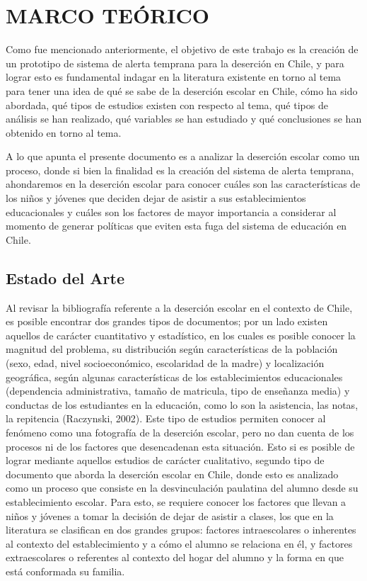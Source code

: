 \chapter{MARCO TEÓRICO}
\label{ch:marcoteorico}
Como fue mencionado anteriormente, el objetivo de este trabajo es la creación de un prototipo de sistema de alerta temprana para la deserción en Chile, y para lograr esto es fundamental indagar en la literatura existente en torno al tema para tener una idea de qué se sabe de la deserción escolar en Chile, cómo ha sido abordada, qué tipos de estudios existen con respecto al tema, qué tipos de análisis se han realizado, qué variables se han estudiado y qué conclusiones se han obtenido en torno al tema. 

A lo que apunta el presente documento es a analizar la deserción escolar como un proceso, donde si bien la finalidad es la creación del sistema de alerta temprana, ahondaremos en la deserción escolar para conocer cuáles son las características de los niños y jóvenes que deciden dejar de asistir a sus establecimientos educacionales y cuáles son los factores de mayor importancia a considerar al momento de generar políticas que eviten esta fuga del sistema de educación en Chile. 

\section{Estado del Arte}

Al revisar la bibliografía  referente a la deserción escolar en el contexto de Chile, es posible encontrar dos grandes tipos de documentos; por un lado existen aquellos de carácter cuantitativo y estadístico, en los cuales es posible conocer la magnitud del problema, su distribución según características de la población (sexo, edad, nivel socioeconómico, escolaridad de la madre) y localización geográfica, según algunas características de los establecimientos educacionales (dependencia administrativa, tamaño de matricula, tipo de enseñanza media) y conductas de los estudiantes en la educación, como lo son la asistencia, las notas, la repitencia (Raczynski, 2002). Este tipo de estudios permiten conocer al fenómeno como una fotografía de la deserción escolar, pero no dan cuenta de los procesos ni de los factores que desencadenan esta situación. Esto si es posible de lograr mediante aquellos estudios de carácter cualitativo, segundo tipo de documento que aborda la deserción escolar en Chile, donde esto es analizado como un proceso que consiste en la desvinculación paulatina del alumno desde su establecimiento escolar. Para esto, se requiere conocer los factores que llevan a niños y jóvenes a tomar la decisión de dejar de asistir a clases, los que en la literatura se clasifican en dos grandes grupos: factores intraescolares o inherentes al contexto del establecimiento y a cómo el alumno se relaciona en él, y factores extraescolares o referentes al contexto del hogar del alumno y la forma en que está conformada su familia.  

